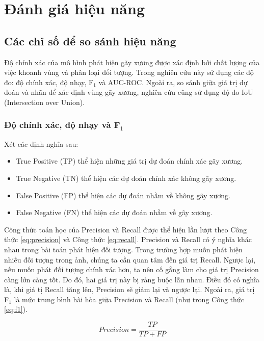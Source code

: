 \documentclass[../the.tex]{subfiles}
\begin{document}
\section{Đánh giá hiệu năng}
\label{sec:eval}



\subsection{Các chỉ số để so sánh hiệu năng}

{\fontsize{13}{12} \selectfont
	Độ chính xác của mô hình phát hiện gãy xương được xác định bởi chất lượng của việc khoanh vùng và phân loại đối tượng. Trong nghiên cứu này sử dụng các độ đo: độ chính xác, độ nhạy, F$_1$ và AUC-ROC. Ngoài ra, so sánh giữa giá trị dự đoán và nhãn để xác định vùng gãy xương, nghiên cứu cũng sử dụng độ đo IoU (Intersection over Union).
}

\subsubsection*{Độ chính xác, độ nhạy và F$_1$}

{\fontsize{13}{12} \selectfont
	Xét các định nghĩa sau:
	\begin {itemize}
	\item True Positive (TP) thể hiện những giá trị dự đoán chính xác gãy xương.
	\item True Negative (TN) thể hiện các dự đoán chính xác không gãy xương.
	\item False Positive (FP) thể hiện các dự đoán nhầm về không gãy xương.
	\item False Negative (FN) thể hiện các dự đoán nhầm về gãy xương.
	\end {itemize}

	Công thức toán học của Precision và Recall được thể hiện lần lượt theo Công thức \ref{eq:precision} và Công thức \ref{eq:recall}. Precision và Recall có ý nghĩa khác nhau trong bài toán phát hiện đối tượng. Trong trường hợp muốn phát hiện nhiều đối tượng trong ảnh, chúng ta cần quan tâm đến giá trị Recall. Ngược lại, nếu muốn phát đối tượng chính xác hơn, ta nên cố gắng làm cho giá trị Precision càng lớn càng tốt. Do đó, hai giá trị này bị ràng buộc lẫn nhau. Điều đó có nghĩa là, khi giá tị Recall tăng lên, Precision sẽ giảm lại và ngược lại. Ngoài ra, giá trị F$_1$ là mức trung bình hài hòa giữa Precision và Recall (như trong Công thức \ref{eq:f1}).
}

\begin{equation}
	Precision = \frac{TP}{TP + FP}
	\label{eq:precision}
\end{equation}
\end{document}
